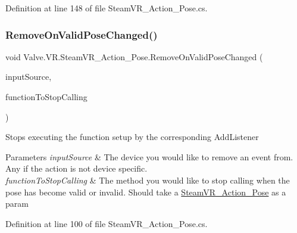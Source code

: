 Definition at line 148 of file Steam\+V\+R\+\_\+\+Action\+\_\+\+Pose.\+cs.

\mbox{\label{class_valve_1_1_v_r_1_1_steam_v_r___action___pose_a061ef630b883bc7c45f489c7f6cf5ca2}} 
\subsubsection{\texorpdfstring{RemoveOnValidPoseChanged()}{RemoveOnValidPoseChanged()}}
{\footnotesize\ttfamily void Valve.\+V\+R.\+Steam\+V\+R\+\_\+\+Action\+\_\+\+Pose.\+Remove\+On\+Valid\+Pose\+Changed (\begin{DoxyParamCaption}\item[{\mbox{\hyperlink{namespace_valve_1_1_v_r_a82e5bf501cc3aa155444ee3f0662853f}{Steam\+V\+R\+\_\+\+Input\+\_\+\+Sources}}}]{input\+Source,  }\item[{\mbox{\hyperlink{class_valve_1_1_v_r_1_1_steam_v_r___action___pose_a742270a6bddfea2afd7f535378ae7830}{Valid\+Pose\+Change\+Handler}}}]{function\+To\+Stop\+Calling }\end{DoxyParamCaption})}



Stops executing the function setup by the corresponding Add\+Listener 


\begin{DoxyParams}{Parameters}
{\em input\+Source} & The device you would like to remove an event from. Any if the action is not device specific.\\
\hline
{\em function\+To\+Stop\+Calling} & The method you would like to stop calling when the pose has become valid or invalid. Should take a \mbox{\hyperlink{class_valve_1_1_v_r_1_1_steam_v_r___action___pose}{Steam\+V\+R\+\_\+\+Action\+\_\+\+Pose}} as a param\\
\hline
\end{DoxyParams}


Definition at line 100 of file Steam\+V\+R\+\_\+\+Action\+\_\+\+Pose.\+cs.

\mbox{\label{class_valve_1_1_v_r_1_1_steam_v_r___action___pose_affeffcb59fcccfbd30d21960498a34d1}} 
